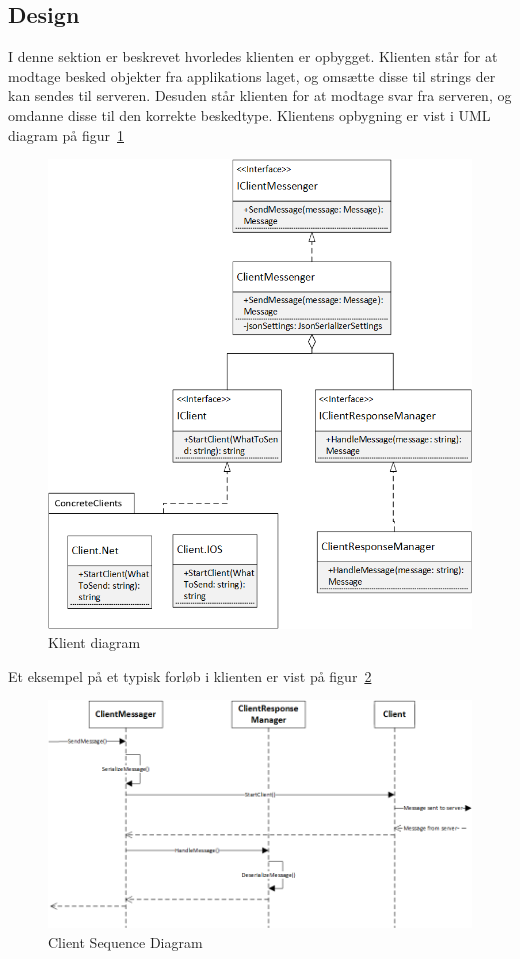 \subsection{Design}
I denne sektion er beskrevet hvorledes klienten er opbygget. Klienten står for at modtage besked objekter fra applikations laget, og omsætte disse til strings der kan sendes til serveren. Desuden står klienten for at modtage svar fra serveren, og omdanne disse til den korrekte beskedtype. Klientens opbygning er vist i UML diagram på figur~\ref{fig:ConnectionClient}
\begin{figure}
	\centering
	\includegraphics[width=0.9\linewidth]{figs/connection/ConnectionClient.png}
	\caption{Klient diagram}
	\label{fig:ConnectionClient}
\end{figure}

Et eksempel på et typisk forløb i klienten er vist på figur~\ref{fig:ClientSequence}
\begin{figure}
	\centering
	\includegraphics[width=0.9\linewidth]{figs/connection/ClientSequence.png}
	\caption{Client Sequence Diagram}
	\label{fig:ClientSequence}
\end{figure}


